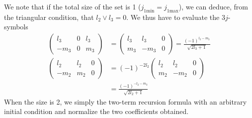 We note that if the total size of the set is 1 ($j_{1\text{min}}=j_{1\text{max}}$), 
we can deduce, from the triangular condition, that $l_2\lor l_3=0$. We thus have
to evaluate the $3j$-symbols 
  \begin{align*}
   \begin{pmatrix} l_3 & 0 & l_3 \\ -m_3 & 0 & m_3 \end{pmatrix} &= \begin{pmatrix} l_3 & l_3 & 0 \\ m_3 & -m_3 & 0\end{pmatrix}=\frac{(-1)^{l_3-m_3}}{\sqrt{2l_3+1}}	\\
   \begin{pmatrix} l_2 & l_2 & 0 \\ -m_2 & m_2 & 0 \end{pmatrix} &= (-1)^{-2l_2}\begin{pmatrix} l_2 & l_2 & 0 \\ m_2 & -m_2 & 0\end{pmatrix}\\&=\frac{(-1)^{-l_2-m_3}}{\sqrt{2l_2+1}}
  \end{align*}
When the size is 2, we simply the two-term recursion formula with an arbitrary 
initial condition and normalize the two coefficients obtained. 

